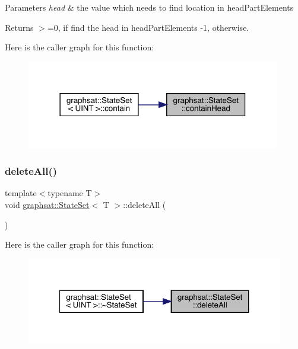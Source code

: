 \begin{DoxyParams}{Parameters}
{\em head} & the value which needs to find location in head\+Part\+Elements\\
\hline
\end{DoxyParams}
\begin{DoxyReturn}{Returns}
$>$=0, if find the head in head\+Part\+Elements -\/1, otherwise. 
\end{DoxyReturn}
Here is the caller graph for this function\+:
\nopagebreak
\begin{figure}[H]
\begin{center}
\leavevmode
\includegraphics[width=314pt]{classgraphsat_1_1_state_set_ab499cfa88c12fedc5d0b6ae8e60ee1e9_icgraph}
\end{center}
\end{figure}
\mbox{\label{classgraphsat_1_1_state_set_a9617a9bb6590058b3175abfc06c84ec7}} 
\subsubsection{\texorpdfstring{deleteAll()}{deleteAll()}}
{\footnotesize\ttfamily template$<$typename T$>$ \\
void \mbox{\hyperlink{classgraphsat_1_1_state_set}{graphsat\+::\+State\+Set}}$<$ T $>$\+::delete\+All (\begin{DoxyParamCaption}{ }\end{DoxyParamCaption})\hspace{0.3cm}{\ttfamily [inline]}}

Here is the caller graph for this function\+:
\nopagebreak
\begin{figure}[H]
\begin{center}
\leavevmode
\includegraphics[width=321pt]{classgraphsat_1_1_state_set_a9617a9bb6590058b3175abfc06c84ec7_icgraph}
\end{center}
\end{figure}
\mbox{\label{classgraphsat_1_1_state_set_a263632e007a4c7b277f41d50dd153f72}} 
